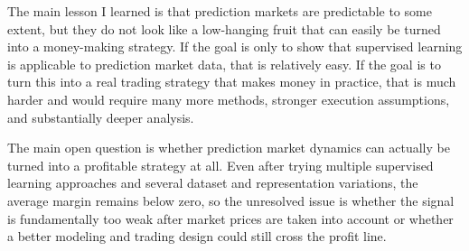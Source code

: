 \documentclass[11pt]{article}
\begin{document}
The main lesson I learned is that prediction markets are predictable to some extent, but they do not look like a low-hanging fruit that can easily be turned into a money-making strategy. If the goal is only to show that supervised learning is applicable to prediction market data, that is relatively easy. If the goal is to turn this into a real trading strategy that makes money in practice, that is much harder and would require many more methods, stronger execution assumptions, and substantially deeper analysis.

The main open question is whether prediction market dynamics can actually be turned into a profitable strategy at all. Even after trying multiple supervised learning approaches and several dataset and representation variations, the average margin remains below zero, so the unresolved issue is whether the signal is fundamentally too weak after market prices are taken into account or whether a better modeling and trading design could still cross the profit line.



\end{document}

